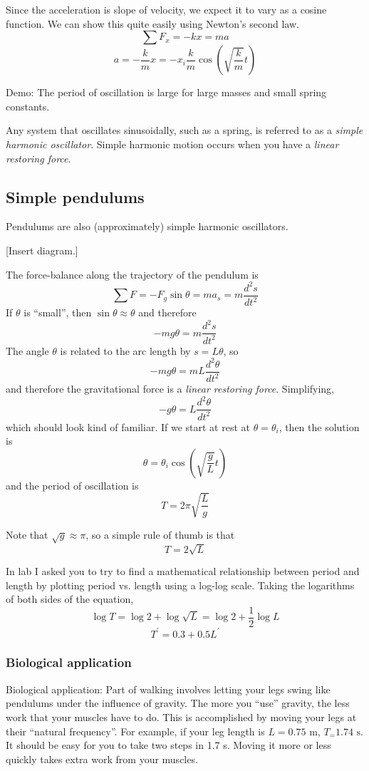 Since the acceleration is slope of velocity, we expect it to vary as a cosine function. We can show this quite easily using Newton's second law.
$$\sum F_x = -kx = ma$$
$$a = -\frac{k}{m}x = -x_i\frac{k}{m}\cos\left(\sqrt{\frac{k}{m}}t\right)$$

Demo: The period of oscillation is large for large masses and small spring constants. 

Any system that oscillates sinusoidally, such as a spring, is referred to as a \textit{simple harmonic oscillator}. Simple harmonic motion occurs when you have a \textit{linear restoring force}.

\subsection{Simple pendulums}
Pendulums are also (approximately) simple harmonic oscillators.

[Insert diagram.]\nopagebreak
\vspace{5cm}

The force-balance along the trajectory of the pendulum is
$$\sum F=-F_g\sin\theta=ma_s=m\frac{d^2s}{dt^2}$$
If $\theta$ is ``small'', then $\sin\theta\approx \theta$ and therefore
$$-mg\theta=m\frac{d^2s}{dt^2}$$
The angle $\theta$ is related to the arc length by $s=L\theta$, so
$$-mg\theta=mL\frac{d^2\theta}{dt^2}$$
and therefore the gravitational force is a \textit{linear restoring force}. Simplifying,
$$-g\theta=L\frac{d^2\theta}{dt^2}$$
which should look kind of familiar. If we start at rest at $\theta=\theta_i$, then the solution is
$$\theta=\theta_i\cos\left(\sqrt{\frac{g}{L}}t\right)$$
and the period of oscillation is
$$\boxed{T=2\pi\sqrt{\frac{L}{g}}}$$

Note that $\sqrt{g}\approx \pi$, so a simple rule of thumb is that
$$T=2\sqrt{L}$$

In lab I asked you to try to find a mathematical relationship between period and length by plotting period vs. length using a log-log scale. Taking the logarithms of both sides of the equation,
$$\log T = \log 2 + \log \sqrt{L} = \log 2 + \frac{1}{2}\log L$$
$$T^\prime = 0.3 + 0.5L^\prime$$


\subsubsection{Biological application}
Biological application: Part of walking involves letting your legs swing like pendulums under the influence of gravity. The more you ``use'' gravity, the less work that your muscles have to do. This is accomplished by moving your legs at their ``natural frequency''. For example, if your leg length is $L=0.75\mbox{ m}$, $T_=1.74\mbox{ s}$. It should be easy for you to take two steps in 1.7 s. Moving it more or less quickly takes extra work from your muscles. 


